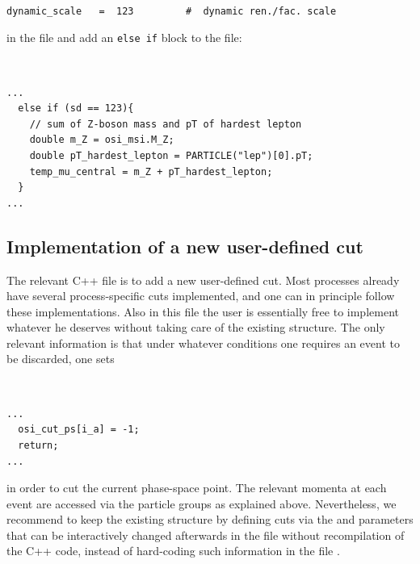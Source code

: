 \documentclass[english,11pt]{article}
\begin{document}
{\tt
\begin{lstlisting}[style=InputStyle]
dynamic_scale   =  123         #  dynamic ren./fac. scale
\end{lstlisting}
}

in the file  and add an {\tt else if} block to the  file:

{\tt
\begin{lstlisting}
...
  else if (sd == 123){                                                                                                                                                                                                                                                                       
    // sum of Z-boson mass and pT of hardest lepton
    double m_Z = osi_msi.M_Z;
    double pT_hardest_lepton = PARTICLE("lep")[0].pT;
    temp_mu_central = m_Z + pT_hardest_lepton;                                                                                                                                        
  }
...
\end{lstlisting}
}


\subsection{Implementation of a new user-defined cut}

The relevant C++ file is
\Matrixversion{} to add a new user-defined cut.
Most processes already have several process-specific cuts implemented, and one can in principle follow these implementations.
Also in this file the user is essentially free to implement whatever he deserves without taking care of the existing structure. 
The only relevant information is that under whatever conditions one requires an event to be discarded, one sets 

{\tt
\begin{lstlisting}
...
  osi_cut_ps[i_a] = -1;
  return;
...
\end{lstlisting}
}

in order to cut the current phase-space point. The relevant momenta at each event are accessed via the particle groups 
as explained above. Nevertheless, we recommend to keep the existing structure by defining cuts via the  and 
 parameters that can be interactively changed afterwards in the file  without recompilation 
of the C++ code, instead of hard-coding such information in the file .
\end{document}
